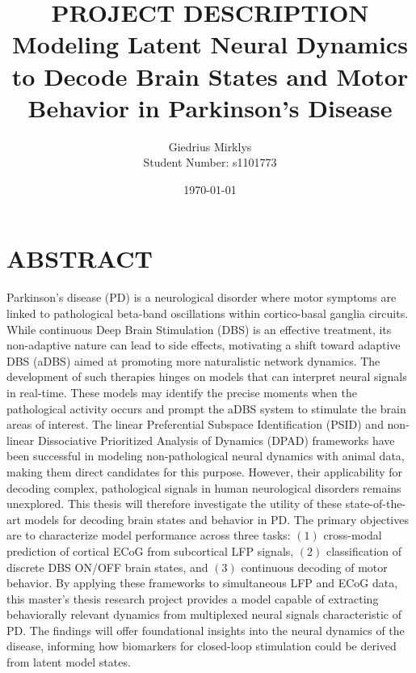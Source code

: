 \documentclass[12pt, a4paper]{article}
\begin{document}
\title{\textbf{PROJECT DESCRIPTION} \\ \vspace{1.5em} \large Modeling Latent Neural Dynamics to Decode Brain States and Motor Behavior in Parkinson’s Disease}
\author{Giedrius Mirklys \\
    \normalsize{Student Number: s1101773}}
\date{\today} %

\maketitle
\RaggedRight


\section{ABSTRACT}
Parkinson's disease (PD) is a neurological disorder where motor symptoms are linked to pathological beta-band oscillations within cortico-basal ganglia circuits. While continuous Deep Brain Stimulation (DBS) is an effective treatment, its non-adaptive nature can lead to side effects, motivating a shift toward adaptive DBS (aDBS) aimed at promoting more naturalistic network dynamics. The development of such therapies hinges on models that can interpret neural signals in real-time. These models may identify the precise moments when the pathological activity occurs and prompt the aDBS system to stimulate the brain areas of interest. The linear Preferential Subspace Identification (PSID) and non-linear Dissociative Prioritized Analysis of Dynamics (DPAD) frameworks have been successful in modeling non-pathological neural dynamics with animal data, making them direct candidates for this purpose. However, their applicability for decoding complex, pathological signals in human neurological disorders remains unexplored. This thesis will therefore investigate the utility of these state-of-the-art models for decoding brain states and behavior in PD. The primary objectives are to characterize model performance across three tasks: $(1)$ cross-modal prediction of cortical ECoG from subcortical LFP signals, $(2)$ classification of discrete DBS ON/OFF brain states, and $(3)$ continuous decoding of motor behavior. By applying these frameworks to simultaneous LFP and ECoG data, this master's thesis research project provides a model capable of extracting behaviorally relevant dynamics from multiplexed neural signals characteristic of PD. The findings will offer foundational insights into the neural dynamics of the disease, informing how biomarkers for closed-loop stimulation could be derived from latent model states.
\end{document}
